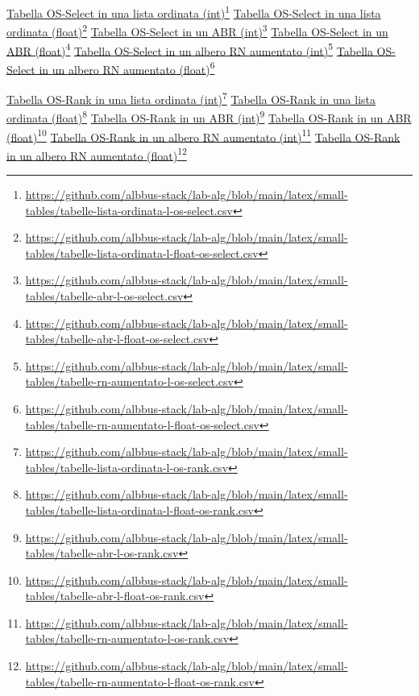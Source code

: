 \documentclass[onecolumn]{article}
\newcommand\anchor[2]{%
  \href{#2}{#1}\footnote{\url{#2}}%
}
\begin{document}
\newpage

\noindent
\anchor{Tabella OS-Select in una lista ordinata (int)}{https://github.com/albbus-stack/lab-alg/blob/main/latex/small-tables/tabelle-lista-ordinata-l-os-select.csv} \label{label:lista-ordinata-l-os-select}
\newline
\anchor{Tabella OS-Select in una lista ordinata (float)}{https://github.com/albbus-stack/lab-alg/blob/main/latex/small-tables/tabelle-lista-ordinata-l-float-os-select.csv} \label{label:lista-ordinata-l-float-os-select}
\newline
\anchor{Tabella OS-Select in un ABR (int)}{https://github.com/albbus-stack/lab-alg/blob/main/latex/small-tables/tabelle-abr-l-os-select.csv} \label{label:abr-l-os-select}
\newline
\anchor{Tabella OS-Select in un ABR (float)}{https://github.com/albbus-stack/lab-alg/blob/main/latex/small-tables/tabelle-abr-l-float-os-select.csv} \label{label:abr-l-float-os-select}
\newline
\anchor{Tabella OS-Select in un albero RN aumentato (int)}{https://github.com/albbus-stack/lab-alg/blob/main/latex/small-tables/tabelle-rn-aumentato-l-os-select.csv} \label{label:rn-aumentato-l-os-select}
\newline
\anchor{Tabella OS-Select in un albero RN aumentato (float)}{https://github.com/albbus-stack/lab-alg/blob/main/latex/small-tables/tabelle-rn-aumentato-l-float-os-select.csv} \label{label:rn-aumentato-l-float-os-select}

\newpage

\noindent
\anchor{Tabella OS-Rank in una lista ordinata (int)}{https://github.com/albbus-stack/lab-alg/blob/main/latex/small-tables/tabelle-lista-ordinata-l-os-rank.csv} \label{label:lista-ordinata-l-os-rank}
\newline
\anchor{Tabella OS-Rank in una lista ordinata (float)}{https://github.com/albbus-stack/lab-alg/blob/main/latex/small-tables/tabelle-lista-ordinata-l-float-os-rank.csv} \label{label:lista-ordinata-l-float-os-rank}
\newline
\anchor{Tabella OS-Rank in un ABR (int)}{https://github.com/albbus-stack/lab-alg/blob/main/latex/small-tables/tabelle-abr-l-os-rank.csv} \label{label:abr-l-os-rank}
\newline
\anchor{Tabella OS-Rank in un ABR (float)}{https://github.com/albbus-stack/lab-alg/blob/main/latex/small-tables/tabelle-abr-l-float-os-rank.csv} \label{label:abr-l-float-os-rank}
\newline
\anchor{Tabella OS-Rank in un albero RN aumentato (int)}{https://github.com/albbus-stack/lab-alg/blob/main/latex/small-tables/tabelle-rn-aumentato-l-os-rank.csv} \label{label:rn-aumentato-l-os-rank}
\newline
\anchor{Tabella OS-Rank in un albero RN aumentato (float)}{https://github.com/albbus-stack/lab-alg/blob/main/latex/small-tables/tabelle-rn-aumentato-l-float-os-rank.csv} \label{label:rn-aumentato-l-float-os-rank}
\end{document}
